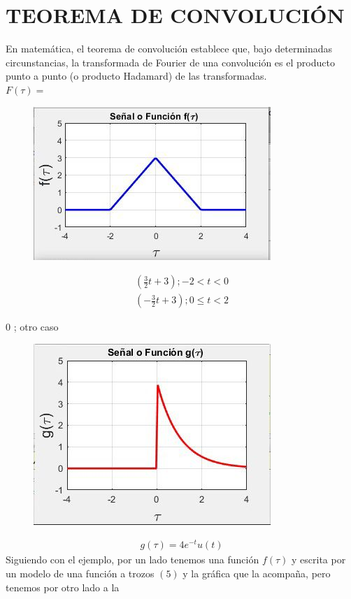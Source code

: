 \documentclass[11pt,letterpaper]{article}
\begin{document}
\section{TEOREMA DE CONVOLUCIÓN}
En matemática, el teorema de convolución establece que, bajo determinadas
circunstancias, la transformada de Fourier de una convolución es el producto punto a punto (o producto Hadamard) de las transformadas.\\
$F(\tau)=$
\begin{figure} [H]
\includegraphics[scale=0.5]{figura 1}
\end{figure}
\begin{align}
(\frac{3}{2} t + 3) ; -2 < t < 0\\
(-\frac{3}{2} t + 3) ; 0 \leq t < 2 
\end{align}
\begin{center}
$0$ ; otro caso
\end{center}
\begin{figure} [H]
\includegraphics[scale=0.5]{figura 2}
\end{figure}
\begin{align}
g(\tau) = 4 e^{-t}u(t)
\end{align}
\newpage
Siguiendo con el ejemplo, por un lado tenemos una función $f (\tau)$ y escrita por un modelo de una
función a trozos $(5)$ y la gráfica que la acompaña, pero tenemos por otro lado a la
\end{document}
